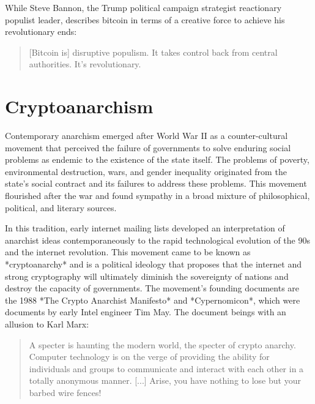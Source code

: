 While Steve Bannon, the Trump political campaign strategist reactionary populist
leader, describes bitcoin in terms of a creative force to achieve his
revolutionary ends:


\begin{quote}
[Bitcoin is] disruptive populism. It takes control back from central authorities.
It's revolutionary.
\end{quote}

\section{Cryptoanarchism}


Contemporary anarchism emerged after World War II as a counter-cultural movement
that perceived the failure of governments to solve enduring social problems as
endemic to the existence of the state itself. The problems of poverty,
environmental destruction, wars, and gender inequality originated from the
state's social contract and its failures to address these problems. This
movement flourished after the war and found sympathy in a broad mixture of
philosophical, political, and literary sources.

In this tradition, early internet mailing lists developed an interpretation of
anarchist ideas contemporaneously to the rapid technological evolution of the
90s and the internet revolution. This movement came to be known as
*cryptoanarchy* and is a political ideology that proposes that the internet and
strong cryptography will ultimately diminish the sovereignty of nations and
destroy the capacity of governments. The movement's founding documents are the
1988 *The Crypto Anarchist Manifesto* and *Cypernomicon*, which were documents
by early Intel engineer Tim May. The document beings with an allusion to Karl
Marx:


\begin{quote}
A specter is haunting the modern world, the specter of crypto anarchy.
Computer technology is on the verge of providing the ability for
individuals and groups to communicate and interact with each other in a
totally anonymous manner. [...] Arise, you have nothing to lose
but your barbed wire fences!
\end{quote}

